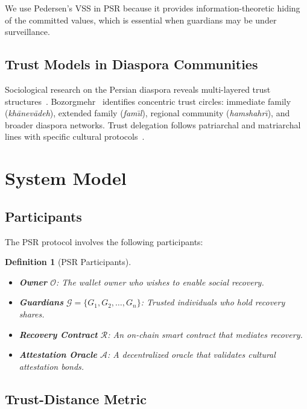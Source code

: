 \documentclass[11pt,a4paper,twocolumn]{article}
\newtheorem{definition}[theorem]{Definition}
\begin{document}
We use Pedersen's VSS in PSR because it provides information-theoretic hiding of the committed values, which is essential when guardians may be under surveillance.

\subsection{Trust Models in Diaspora Communities}

Sociological research on the Persian diaspora reveals multi-layered trust structures~\cite{mobasher2012iranians,hakimzadeh2006iran}. Bozorgmehr~\cite{bozorgmehr1997internal} identifies concentric trust circles: immediate family (\textit{kh\={a}nev\={a}deh}), extended family (\textit{fam\={\i}l}), regional community (\textit{hamshah\-r\={\i}}), and broader diaspora networks. Trust delegation follows patriarchal and matriarchal lines with specific cultural protocols~\cite{beeman1986persian}.

\section{System Model}\label{sec:model}

\subsection{Participants}

The PSR protocol involves the following participants:

\begin{definition}[PSR Participants]
\begin{itemize}
  \item \textbf{Owner} $\mathcal{O}$: The wallet owner who wishes to enable social recovery.
  \item \textbf{Guardians} $\mathcal{G} = \{G_1, G_2, \ldots, G_n\}$: Trusted individuals who hold recovery shares.
  \item \textbf{Recovery Contract} $\mathcal{R}$: An on-chain smart contract that mediates recovery.
  \item \textbf{Attestation Oracle} $\mathcal{A}$: A decentralized oracle that validates cultural attestation bonds.
\end{itemize}
\end{definition}

\subsection{Trust-Distance Metric}
\end{document}
